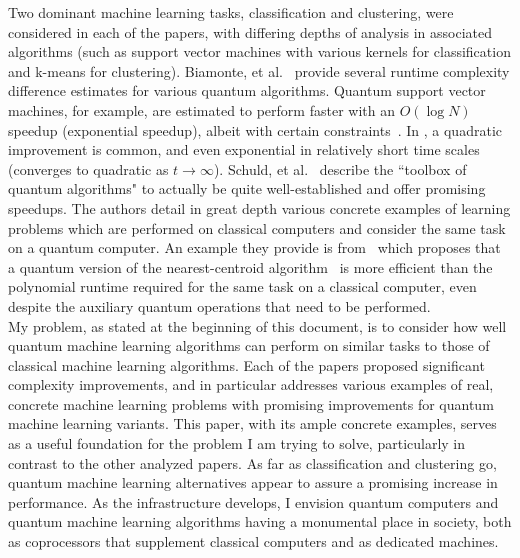 \documentclass{article}
\begin{document}
  Two dominant machine learning tasks, classification and clustering, were considered in each of the papers, with differing depths of analysis in associated algorithms (such as support vector machines with various kernels for classification and k-means for clustering). Biamonte, et al.~\cite{biamonte} provide several runtime complexity difference estimates for various quantum algorithms. Quantum support vector machines, for example, are estimated to perform faster with an $O(\log{N})$ speedup (exponential speedup), albeit with certain constraints~\cite{aaronson}. In \cite{dunjko}, a quadratic improvement is common, and even exponential in relatively short time scales (converges to quadratic as $t \rightarrow \infty$). Schuld, et al.~\cite{schuld} describe the ``toolbox of quantum algorithms" to actually be quite well-established and offer promising speedups. The authors detail in great depth various concrete examples of learning problems which are performed on classical computers and consider the same task on a quantum computer. An example they provide is from~\cite{lloyd} which proposes that a quantum version of the nearest-centroid algorithm~\cite{centroid} is more efficient than the polynomial runtime required for the same task on a classical computer, even despite the auxiliary quantum operations that need to be performed. \\

  My problem, as stated at the beginning of this document, is to consider how well quantum machine learning algorithms can perform on similar tasks to those of classical machine learning algorithms. Each of the papers proposed significant complexity improvements, and \cite{schuld} in particular addresses various examples of real, concrete machine learning problems with promising improvements for quantum machine learning variants. This paper, with its ample concrete examples, serves as a useful foundation for the problem I am trying to solve, particularly in contrast to the other analyzed papers. As far as classification and clustering go, quantum machine learning alternatives appear to assure a promising increase in performance. As the infrastructure develops, I envision quantum computers and quantum machine learning algorithms having a monumental place in society, both as coprocessors that supplement classical computers and as dedicated machines.

\newpage

\raggedright

\end{document}
